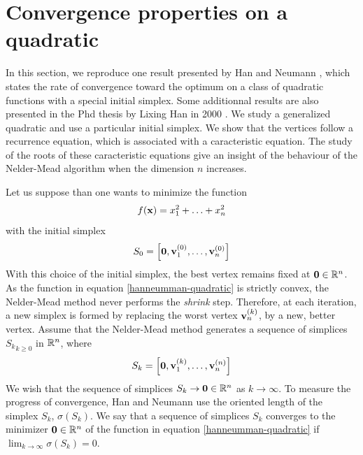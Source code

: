 

\section{Convergence properties on a quadratic}

In this section, we reproduce one result 
presented by Han and Neumann \cite{HanNeumann2006}, which states 
the rate of convergence toward the optimum on a class of quadratic functions with a special initial 
simplex.
Some additionnal results are also presented in the Phd thesis by Lixing Han in 2000 \cite{Han2000}.
We study a generalized quadratic and use a particular 
initial simplex. We show that the vertices follow 
a recurrence equation, which is associated with a caracteristic 
equation. The study of the roots of these caracteristic equations 
give an insight of the behaviour of the Nelder-Mead algorithm
when the dimension $n$ increases.

Let us suppose than one wants to minimize the function 
\begin{eqnarray}
\label{hanneumman-quadratic}
f(\mathbf{x}) = x_1^2+\ldots+x_n^2
\end{eqnarray}
with the initial simplex 
\begin{eqnarray}
S_0 = \left[\bold{0},\mathbf{v}^{(0)}_1,\ldots,\mathbf{v}^{(0)}_n\right]
\end{eqnarray}
With this choice of the initial simplex, the best vertex remains fixed 
at $\bold{0}\in\mathbb{R}^n$. As the function in equation \ref{hanneumman-quadratic}
is strictly convex, the Nelder-Mead method never performs
the \emph{shrink} step. Therefore, at each iteration, a new simplex 
is formed by replacing the worst vertex $\mathbf{v}^{(k)}_n$, by a 
new, better vertex. Assume that the Nelder-Mead method 
generates a sequence of simplices ${S_k}_{k\geq 0}$ in $\mathbb{R}^n$,
where 
\begin{eqnarray}
S_k = \left[\bold{0},\mathbf{v}^{(k)}_1,\ldots,\mathbf{v}^{(n)}_n\right]
\end{eqnarray}
We wish that the sequence of simplices ${S_k}\rightarrow \bold{0}\in\mathbb{R}^n$
as $k\rightarrow \infty$. To measure the progress of convergence,
Han and Neumann use the oriented length of the simplex $S_k$, $\sigma(S_k)$.
We say that a sequence of simplices ${S_k}$ converges to the minimizer $\bold{0}\in\mathbb{R}^n$
of the function in equation \ref{hanneumman-quadratic} if 
$\lim_{k\rightarrow \infty} \sigma(S_k) = 0$.

